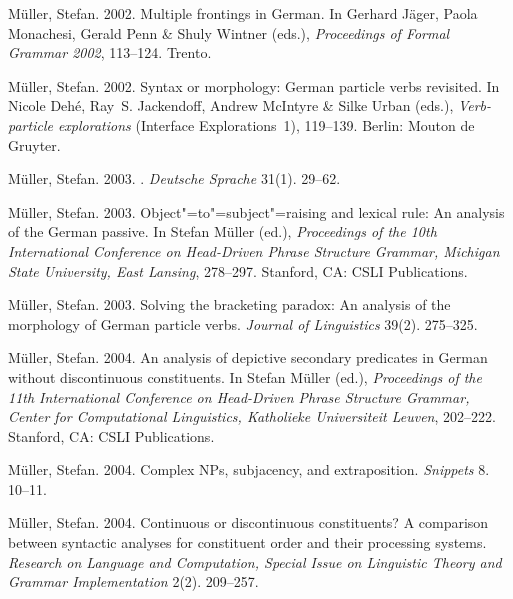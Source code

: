 \begin{thebibliography}{1420}
M{\"u}ller, Stefan. 2002{}.
\newblock Multiple frontings in {German}.
\newblock In Gerhard J{\"a}ger, Paola Monachesi, Gerald Penn \& Shuly Wintner
  (eds.), \emph{Proceedings of {Formal Grammar 2002}}, 113--124. Trento.

M{\"u}ller, Stefan. 2002{}.
\newblock Syntax or morphology: {German} particle verbs revisited.
\newblock In Nicole Deh{\'e}, Ray~S. Jackendoff, Andrew McIntyre \& Silke Urban
  (eds.), \emph{Verb-par\-ti\-cle explorations} (Interface Explorations~1),
  119--139. Berlin: Mouton de Gruyter.

M{\"u}ller, Stefan. 2003{}.
.
\newblock \emph{Deutsche Sprache} 31(1). 29--62.

M{\"u}ller, Stefan. 2003{}.
\newblock Object"=to"=subject"=raising and lexical rule: {An} analysis of the
  {German} passive.
\newblock In Stefan M{\"u}ller (ed.), \emph{Proceedings of the {10th
  International Conference on Head-Driven Phrase Structure Grammar, Michigan
  State University, East Lansing}}, 278--297. Stanford, CA: CSLI Publications.

M{\"u}ller, Stefan. 2003{}.
\newblock Solving the bracketing paradox: {An} analysis of the morphology of
  {German} particle verbs.
\newblock \emph{Journal of Linguistics} 39(2). 275--325.

M{\"u}ller, Stefan. 2004{}.
\newblock An analysis of depictive secondary predicates in {German} without
  discontinuous constituents.
\newblock In Stefan M{\"u}ller (ed.), \emph{Proceedings of the {11th
  International Conference on Head-Driven Phrase Structure Grammar, Center for
  Computational Linguistics, Katholieke Universiteit Leuven}}, 202--222.
  Stanford, CA: CSLI Publications.

M{\"u}ller, Stefan. 2004{}.
\newblock Complex {NPs}, subjacency, and extraposition.
\newblock \emph{Snippets} 8. 10--11.

M{\"u}ller, Stefan. 2004{}.
\newblock Continuous or discontinuous constituents? {A} comparison between
  syntactic analyses for constituent order and their processing systems.
\newblock \emph{Research on Language and Computation, Special Issue on
  Linguistic Theory and Grammar Implementation} 2(2). 209--257.


\end{thebibliography}
